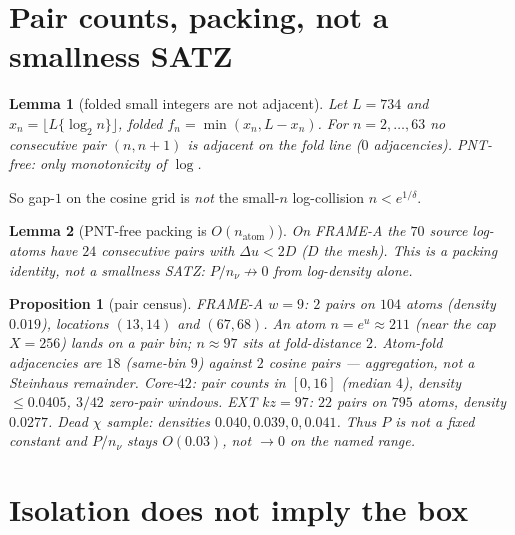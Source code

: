 \documentclass[11pt]{article}
\newtheorem{lemma}{Lemma}
\newtheorem{prop}{Proposition}
\theoremstyle{remark}
\begin{document}
\section{Pair counts, packing, not a smallness SATZ}\label{sec:count}

\begin{lemma}[folded small integers are not adjacent]\label{lem:foldsmall}
Let $L=734$ and $x_n=\bigl\lfloor L\{\log_2 n\}\bigr\rfloor$,
folded $f_n=\min(x_n,L-x_n)$.
For $n=2,\ldots,63$ no consecutive pair $(n,n+1)$ is adjacent
on the fold line ($0$ adjacencies).
PNT-free: only monotonicity of $\log$.
\end{lemma}

So gap-$1$ on the cosine grid is \emph{not} the small-$n$
log-collision $n<e^{1/\delta}$.

\begin{lemma}[PNT-free packing is $O(n_{\mathrm{atom}})$]\label{lem:pack}
On FRAME-A the $70$ source log-atoms have $24$ consecutive
pairs with $\Delta u<2D$ ($D$ the mesh).
This is a packing identity, not a smallness SATZ:
$P/n_\nu\not\to 0$ from log-density alone.
\end{lemma}

\begin{prop}[pair census]\label{prop:count}
FRAME-A $w=9$: $2$ pairs on $104$ atoms (density $0.019$),
locations $(13,14)$ and $(67,68)$.
An atom $n=e^{u}\approx 211$ (near the cap $X=256$) lands on a
pair bin; $n\approx 97$ sits at fold-distance $2$.
Atom-fold adjacencies are $18$ (same-bin $9$) against $2$
cosine pairs --- aggregation, not a Steinhaus remainder.
Core-$42$: pair counts in $[0,16]$ (median $4$), density
$\le 0.0405$, $3/42$ zero-pair windows.
EXT $kz=97$: $22$ pairs on $795$ atoms, density $0.0277$.
Dead $\chi$ sample: densities $0.040,0.039,0,0.041$.
Thus $P$ is not a fixed constant and $P/n_\nu$ stays
$O(0.03)$, not $\to 0$ on the named range.
\end{prop}

\section{Isolation does not imply the box}\label{sec:box}
\end{document}
